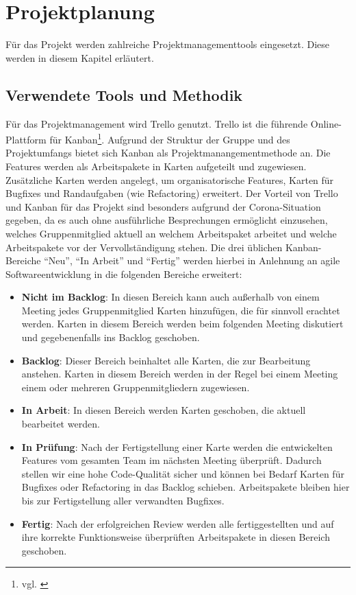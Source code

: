 \section{Projektplanung}
Für das Projekt werden zahlreiche Projektmanagementtools eingesetzt.
Diese werden in diesem Kapitel erläutert.

\subsection{Verwendete Tools und Methodik}
Für das Projektmanagement wird Trello genutzt.
Trello ist die führende Online-Plattform für Kanban\footnote{vgl. \cite{atlassian}}.
Aufgrund der Struktur der Gruppe und des Projektumfangs bietet sich Kanban als Projektmanangementmethode an.
Die Features werden als Arbeitspakete in Karten aufgeteilt und zugewiesen.
Zusätzliche Karten werden angelegt, um organisatorische Features, Karten für Bugfixes und Randaufgaben (wie Refactoring) erweitert.
Der Vorteil von Trello und Kanban für das Projekt sind besonders aufgrund der Corona-Situation gegeben, da es auch ohne ausführliche Besprechungen ermöglicht einzusehen, welches Gruppenmitglied aktuell an welchem Arbeitspaket arbeitet und welche Arbeitspakete vor der Vervollständigung stehen.
Die drei üblichen Kanban-Bereiche \enquote{Neu}, \enquote{In Arbeit} und \enquote{Fertig} werden hierbei in Anlehnung an agile Softwareentwicklung in die folgenden Bereiche erweitert:
\begin{itemize}
    \item \textbf{Nicht im Backlog}: In diesen Bereich kann auch außerhalb von einem Meeting jedes Gruppenmitglied Karten hinzufügen, die für sinnvoll erachtet werden. Karten in diesem Bereich werden beim folgenden Meeting diskutiert und gegebenenfalls ins Backlog geschoben.
    \item \textbf{Backlog}: Dieser Bereich beinhaltet alle Karten, die zur Bearbeitung anstehen. Karten in diesem Bereich werden in der Regel bei einem Meeting einem oder mehreren Gruppenmitgliedern zugewiesen.
    \item \textbf{In Arbeit}: In diesen Bereich werden Karten geschoben, die aktuell bearbeitet werden.
    \item \textbf{In Prüfung}: Nach der Fertigstellung einer Karte werden die entwickelten Features vom gesamten Team im nächsten Meeting überprüft. Dadurch stellen wir eine hohe Code-Qualität sicher und können bei Bedarf Karten für Bugfixes oder Refactoring in das Backlog schieben. Arbeitspakete bleiben hier bis zur Fertigstellung aller verwandten Bugfixes.
    \item \textbf{Fertig}: Nach der erfolgreichen Review werden alle fertiggestellten und auf ihre korrekte Funktionsweise überprüften Arbeitspakete in diesen Bereich geschoben.
\end{itemize}

